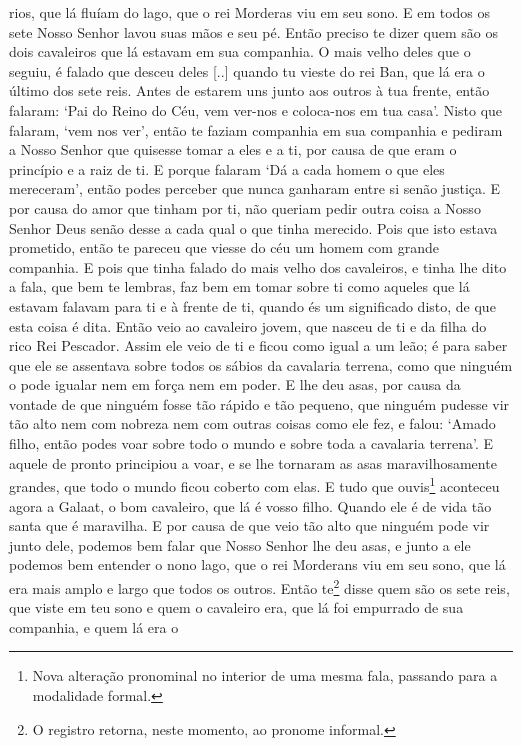 rios, que lá fluíam do lago, que o rei Morderas viu em seu sono. E em todos os
sete Nosso Senhor lavou suas mãos e seu pé. Então preciso te dizer quem são os
dois cavaleiros que lá estavam em sua companhia. O mais velho deles que o
seguiu, é falado que desceu deles [..] quando tu vieste do rei Ban, que lá era
o último dos sete reis. Antes de estarem uns junto aos outros à tua frente,
então falaram: ‘Pai do Reino do Céu, vem ver-nos e coloca-nos em tua casa’.
Nisto que falaram, ‘vem nos ver’, então te faziam companhia em sua companhia e
pediram a Nosso Senhor que quisesse tomar a eles e a ti, por causa de que eram
o princípio e a raiz de ti. E porque falaram ‘Dá a cada homem o que eles
mereceram’, então podes perceber que nunca ganharam entre si senão justiça. E
por causa do amor que tinham por ti, não queriam pedir outra coisa a Nosso
Senhor Deus senão desse a cada qual o que tinha merecido. Pois que isto estava
prometido, então te pareceu que viesse do céu um homem com grande companhia. E
pois que tinha falado do mais velho dos cavaleiros, e tinha lhe dito a fala,
que bem te lembras, faz bem em tomar sobre ti como aqueles que lá estavam
falavam para ti e à frente de ti, quando és um significado disto, de que esta
coisa é dita. Então veio ao cavaleiro jovem, que nasceu de ti e da filha do
rico Rei Pescador. Assim ele veio de ti e ficou como igual a um leão; é para
saber que ele se assentava sobre todos os sábios da cavalaria terrena, como que
ninguém o pode igualar nem em força nem em poder. E lhe deu asas, por causa da
vontade de que ninguém fosse tão rápido e tão pequeno, que ninguém pudesse vir
tão alto nem com nobreza nem com outras coisas como ele fez, e falou: ‘Amado
filho, então podes voar sobre todo o mundo e sobre toda a cavalaria terrena’. E
aquele de pronto principiou a voar, e se lhe tornaram as asas maravilhosamente
grandes, que todo o mundo ficou coberto com elas. E tudo que ouvis\footnote{
Nova alteração pronominal no interior de uma mesma fala, passando para a
modalidade formal.}  aconteceu agora a Galaat, o bom cavaleiro, que
lá é vosso filho. Quando ele é de vida tão santa que é maravilha. E por causa
de que veio tão alto que ninguém pode vir junto dele, podemos bem falar que
Nosso Senhor lhe deu asas, e junto a ele podemos bem entender o nono lago, que
o rei Morderans viu em seu sono, que lá era mais amplo e largo que todos os
outros. Então te\footnote{ O registro retorna, neste momento, ao pronome
informal.}  disse quem são os sete reis, que viste em teu sono e
quem o cavaleiro era, que lá foi empurrado de sua companhia, e quem lá era o
